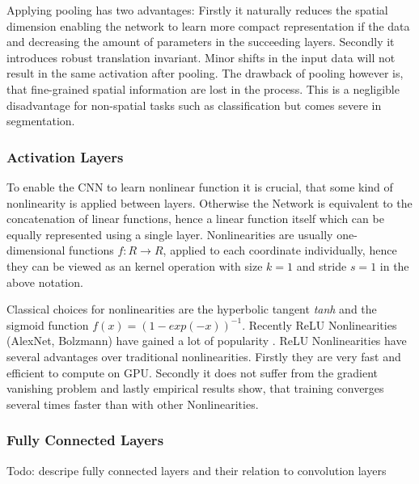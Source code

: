 Applying pooling has two  advantages: Firstly it naturally reduces the spatial dimension enabling the network to learn more compact representation if the data and decreasing the amount of parameters in the succeeding layers. Secondly it introduces robust translation invariant. Minor shifts in the input data will not result in the same activation after pooling. The drawback of pooling however is, that fine-grained spatial information are lost in the process. This is a negligible disadvantage for non-spatial tasks such as classification but comes severe in segmentation. 

 \subsubsection{Activation Layers}
 
 To enable the CNN to learn nonlinear function it is crucial, that some kind of nonlinearity is applied between layers. Otherwise the Network is equivalent to the concatenation of linear functions, hence a linear function itself which can be equally represented using a single layer. Nonlinearities are usually one-dimensional functions $f: R \rightarrow R$, applied to each coordinate individually, hence they can be viewed as an kernel operation with size $k=1$ and stride $s=1$ in the above notation. 
 
Classical choices for nonlinearities are the hyperbolic tangent \emph{tanh} and the sigmoid function $f(x) = (1- exp(-x))^{-1}$. Recently ReLU Nonlinearities \cite{AlexNet}(AlexNet, Bolzmann) have gained a lot of popularity \cite{AlexNet,VGG16,googLeNeT}. ReLU Nonlinearities have several advantages over traditional nonlinearities. Firstly they are very fast and efficient to compute on GPU. Secondly it does not suffer from the gradient vanishing problem and lastly empirical results show, that training converges several times faster than with other Nonlinearities.

\subsubsection{Fully Connected Layers}

Todo: descripe fully connected layers and their relation to convolution layers

\label{sec:fully_connected}

